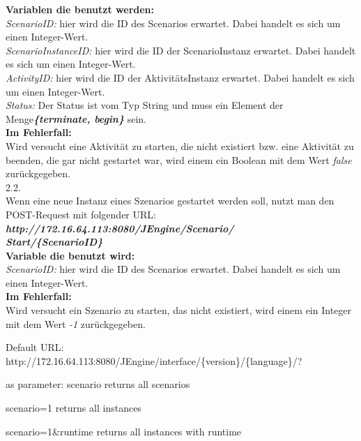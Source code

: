 \documentclass{template/ecsreport}      %
\begin{document}
\begin{enumerate}
\textbf{Variablen die benutzt werden:}\\
\textit{ScenarioID:} hier wird die ID des Scenarios erwartet. Dabei handelt es sich um einen Integer-Wert.\\
\textit{ScenarioInstanceID:} hier wird die ID der ScenarioInstanz erwartet. Dabei handelt es sich um einen Integer-Wert.\\
\textit{ActivityID:} hier wird die ID der AktivitätsInstanz erwartet. Dabei handelt es sich um einen Integer-Wert.\\
\textit{Status:} Der Status ist vom Typ String und muss ein Element der Menge\textbf{\textit{\{terminate, begin\}}} sein.\\

\textbf{Im Fehlerfall:}\\
Wird versucht eine Aktivität zu starten, die nicht existiert bzw. eine Aktivität zu beenden, die gar nicht gestartet war, wird einem ein Boolean mit dem Wert \textit{false} zurückgegeben.\\

2.2.\\ Wenn eine neue Instanz eines Szenarios gestartet werden soll, nutzt man den POST-Request mit folgender URL:\\
\textit{\textbf{http://172.16.64.113:8080/JEngine/Scenario/\\Start/\{ScenarioID\}}}\\

\textbf{Variable die benutzt wird:}\\
\textit{ScenarioID:} hier wird die ID des Scenarios erwartet. Dabei handelt es sich um einen Integer-Wert.\\

\textbf{Im Fehlerfall:}\\
Wird versucht ein Szenario zu starten, das nicht existiert, wird einem ein Integer mit dem Wert \textit{-1} zurückgegeben.\\

\end{enumerate}



Default URL:
http://172.16.64.113:8080/JEngine/interface/\{version\}/\{language\}/?

as parameter:
scenario
returns all scenarios
 
scenario=1
returns all instances

scenario=1&runtime
returns all instances with runtime
\end{document}
